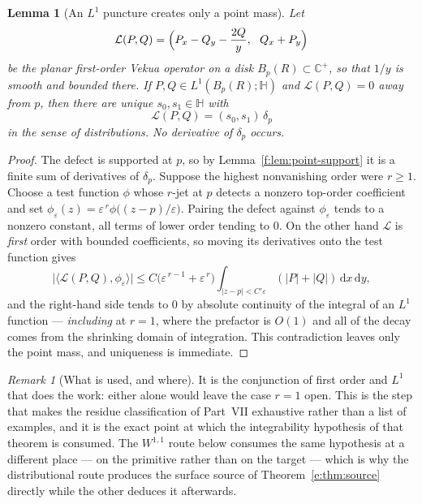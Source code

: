 \documentclass[11pt,a4paper]{article}
\numberwithin{equation}{section}
\newtheorem{lemma}[theorem]{Lemma}
\theoremstyle{definition}
\theoremstyle{remark}
\newtheorem{remark}[theorem]{Remark}
\theoremstyle{plain}
\newcommand{\HH}{\mathbb H}
\newcommand{\CC}{\mathbb C}
\newcommand{\Cplus}{\CC^{+}}
\newcommand{\abs}[1]{\lvert #1\rvert}
\newcommand{\dd}{\mathrm d}
\begin{document}
\begin{lemma}[An $L^1$ puncture creates only a point mass]
\label{f:lem:defect-scaling}
Let
\[
 \mathcal L(P,Q)=\Bigl(P_x-Q_y-\frac{2Q}{y},\ \ Q_x+P_y\Bigr)
\]
be the planar first-order Vekua operator on a disk
$B_p(R)\subset\Cplus$, so that $1/y$ is smooth and bounded there. If
$P,Q\in L^1(B_p(R);\HH)$ and $\mathcal L(P,Q)=0$ away from $p$, then there
are unique $s_0,s_1\in\HH$ with
\begin{equation}
 \mathcal L(P,Q)=(s_0,s_1)\,\delta_p
 \label{f:eq:defect}
\end{equation}
in the sense of distributions. No derivative of $\delta_p$ occurs.
\end{lemma}
\begin{proof}
The defect is supported at $p$, so by Lemma~\ref{f:lem:point-support} it is
a finite sum of derivatives of $\delta_p$. Suppose the highest nonvanishing
order were $r\ge1$. Choose a test function $\phi$ whose $r$-jet at $p$
detects a nonzero top-order coefficient and set
$\phi_\varepsilon(z)=\varepsilon^{\,r}\phi\bigl((z-p)/\varepsilon\bigr)$.
Pairing the defect against $\phi_\varepsilon$ tends to a nonzero constant,
all terms of lower order tending to $0$. On the other hand $\mathcal L$ is
\emph{first} order with bounded coefficients, so moving its derivatives
onto the test function gives
\[
 \abs{\langle\mathcal L(P,Q),\phi_\varepsilon\rangle}
 \le C\bigl(\varepsilon^{\,r-1}+\varepsilon^{\,r}\bigr)
 \int_{\abs{z-p}<C'\varepsilon}(\abs P+\abs Q)\,\dd x\,\dd y ,
\]
and the right-hand side tends to $0$ by absolute continuity of the integral
of an $L^1$ function --- \emph{including} at $r=1$, where the prefactor is
$O(1)$ and all of the decay comes from the shrinking domain of
integration. This contradiction leaves only the point mass, and uniqueness
is immediate.
\end{proof}

\begin{remark}[What is used, and where]
It is the conjunction of first order and $L^1$ that does the work: either
alone would leave the case $r=1$ open. This is the step that makes the
residue classification of Part~VII exhaustive rather than a list of
examples, and it is the exact point at which the integrability hypothesis
of that theorem is consumed. The $W^{1,1}$ route below consumes the same
hypothesis at a different place --- on the primitive rather than on the
target --- which is why the distributional route produces the surface
source of Theorem~\ref{e:thm:source} directly while the other deduces it
afterwards.
\end{remark}
\end{document}
